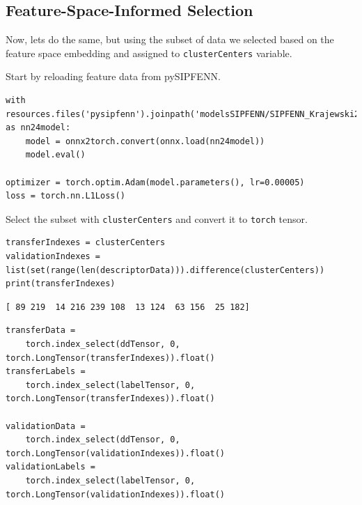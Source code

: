 \hypertarget{feature-space-informed-selection}{%
\subsection{Feature-Space-Informed
Selection}\label{pysipfenntutorial2:feature-space-informed-selection}}

Now, lets do the same, but using the subset of data we selected based on
the feature space embedding and assigned to
\texttt{clusterCenters} variable.

Start by reloading feature data from pySIPFENN.

\begin{verbatim}
with resources.files('pysipfenn').joinpath('modelsSIPFENN/SIPFENN_Krajewski2020_NN24.onnx') as nn24model:
    model = onnx2torch.convert(onnx.load(nn24model))
    model.eval()

optimizer = torch.optim.Adam(model.parameters(), lr=0.00005)
loss = torch.nn.L1Loss()
\end{verbatim}

Select the subset with \texttt{clusterCenters} and
convert it to \texttt{torch} tensor.

\begin{verbatim}
transferIndexes = clusterCenters
validationIndexes = list(set(range(len(descriptorData))).difference(clusterCenters))
print(transferIndexes)
\end{verbatim}

\begin{verbatim}
[ 89 219  14 216 239 108  13 124  63 156  25 182]
\end{verbatim}

\begin{verbatim}
transferData = 
    torch.index_select(ddTensor, 0, torch.LongTensor(transferIndexes)).float()
transferLabels = 
    torch.index_select(labelTensor, 0, torch.LongTensor(transferIndexes)).float()

validationData = 
    torch.index_select(ddTensor, 0, torch.LongTensor(validationIndexes)).float()
validationLabels = 
    torch.index_select(labelTensor, 0, torch.LongTensor(validationIndexes)).float()
\end{verbatim}

